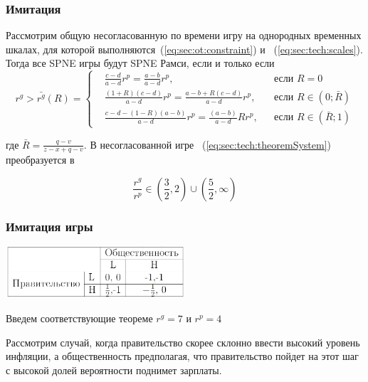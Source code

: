 \documentclass {beamer}
\begin{document}
\begin{frame}
	\frametitle{Имитация}
	\begin{theorem}
	\small	Рассмотрим общую несогласованную по времени игру на однородных временных шкалах, для которой выполняются~(\ref{eq:sec:ot:constraint}) и ~(\ref{eq:sec:tech:scales}). Тогда все SPNE игры будут SPNE Рамси, если и только если
		{\scriptsize
		\begin{equation}
		\label{eq:sec:tech:theoremSystem}
		r^g> \bar{r^g}(R) = \left\{ 
		\begin{aligned} 
		&\frac{c - d}{a-d}r^p= \frac{a-b}{a-d}r^p, &&\text{если } R=0
		\\
		&\frac{(1+R)(c-d)}{a-d}r^p= \frac{a-b + R(c-d)}{a-d}r^p, &&\text{если } 	R\in(0; \bar{R})
		\\
		&\frac{c-d-(1-R)(a-b)}{a-d}r^p= \frac{(a-b)}{a-d}Rr^p, &&\text{если } 	R\in(\bar{R};1)
		\end{aligned}
		\right.		
		\end{equation}
	}

	где $\bar{R}=\frac{q-v}{z-x+q-v}$. В несогласованной игре   ~(\ref{eq:sec:tech:theoremSystem}) преобразуется в 
	
	\begin{equation}
	\frac{r^g}{r^p} \in \left(\frac{3}{2}, 2\right)\cup \left(\frac{5}{2}, \infty\right)
	\end{equation}
	\end{theorem}
\end{frame}

\begin{frame}
	\frametitle{Имитация игры}
	  \begin{center}
	  	\includegraphics[width=0.5\textwidth]{second}
	  \end{center}
	Введем соответствующие теореме $r^g= 7$ и $r^p= 4$
	
	Рассмотрим случай, когда правительство скорее склонно ввести высокий уровень инфляции, а общественность предполагая, что правительство пойдет на этот шаг с высокой долей вероятности поднимет зарплаты.	
\end{frame}
\end{document}
